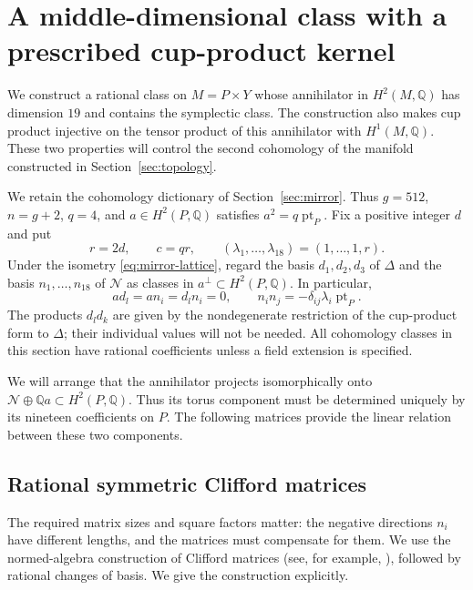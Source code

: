 \documentclass[11pt]{article}
\numberwithin{equation}{section}
\theoremstyle{definition}
\theoremstyle{remark}
\newcommand{\Q}{\mathbb Q}
\newcommand{\pt}{\operatorname{pt}}
\begin{document}
\section{A middle-dimensional class with a prescribed cup-product kernel}
\label{sec:clifford}

We construct a rational class on $M=P\times Y$ whose annihilator in
$H^2(M,\Q)$ has dimension $19$ and contains the symplectic class.
The construction also makes cup product injective on the tensor product
of this annihilator with $H^1(M,\Q)$.  These two properties will control
the second cohomology of the manifold constructed in
Section~\ref{sec:topology}.

We retain the cohomology dictionary of Section~\ref{sec:mirror}.
Thus $g=512$, $n=g+2$, $q=4$, and $a\in H^2(P,\Q)$ satisfies
$a^2=q\pt_P$.  Fix a positive integer $d$ and put
\[
 r=2d,\qquad c=qr,\qquad
 (\lambda_1,\ldots,\lambda_{18})=(1,\ldots,1,r).
\]
Under the isometry \eqref{eq:mirror-lattice}, regard the basis
$d_1,d_2,d_3$ of $\Delta$ and the basis $n_1,\ldots,n_{18}$ of
$\mathcal N$ as classes in $a^\perp\subset H^2(P,\Q)$.
In particular,
\begin{equation}\label{eq:clifford-P-pairings}
 a d_l=a n_i=d_l n_i=0,\qquad
 n_i n_j=-\delta_{ij}\lambda_i\pt_P.
\end{equation}
The products $d_l d_k$ are given by the nondegenerate restriction of
the cup-product form to $\Delta$; their individual values will not be
needed.  All cohomology classes in this section have rational
coefficients unless a field extension is specified.

We will arrange that the annihilator projects isomorphically onto
$\mathcal N\oplus\Q a\subset H^2(P,\Q)$.  Thus its torus component
must be determined uniquely by its nineteen coefficients on $P$.
The following matrices provide the linear relation between these two
components.

\subsection{Rational symmetric Clifford matrices}

The required matrix sizes and square factors matter: the negative
directions $n_i$ have different lengths, and the matrices must compensate
for them.  We use the normed-algebra construction of Clifford matrices
(see, for example, \cite[Sections~2.2--2.3]{Algebra:Baez}), followed by
rational changes of basis.  We give the construction explicitly.
\end{document}
